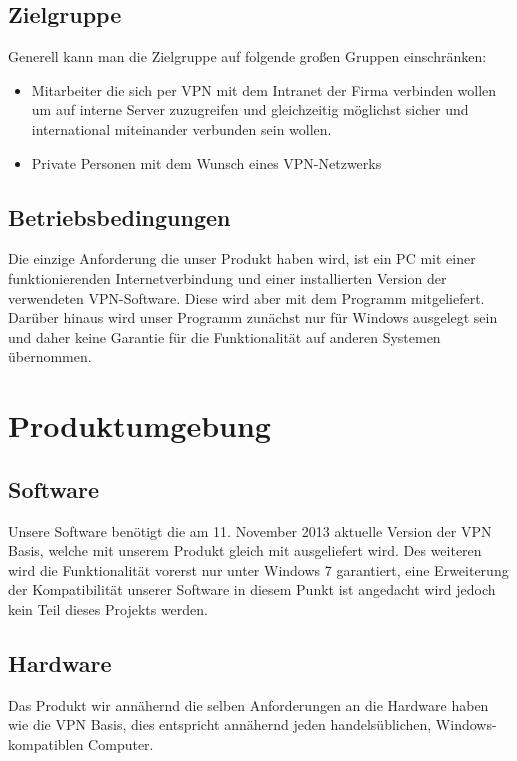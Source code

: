 \documentclass[a4paper,12pt]{scrreprt}
\begin{document}
	 	
		
		
		
	\section{Zielgruppe}
	
	Generell kann man die Zielgruppe auf folgende großen Gruppen einschränken:
	\begin{itemize}
	\item Mitarbeiter die sich per VPN mit dem Intranet der Firma verbinden wollen um auf interne Server zuzugreifen und gleichzeitig möglichst sicher und international miteinander verbunden sein wollen.
	\item Private Personen mit dem Wunsch eines VPN-Netzwerks
	\end{itemize}
		
	\section{Betriebsbedingungen}
	Die einzige Anforderung die unser Produkt haben wird, ist ein PC mit einer funktionierenden Internetverbindung und einer installierten Version der verwendeten VPN-Software. Diese wird aber mit dem Programm mitgeliefert. Darüber hinaus wird unser Programm zunächst nur für Windows ausgelegt sein und daher keine Garantie für die Funktionalität auf anderen Systemen übernommen.
		
\chapter{Produktumgebung}
	
	\section{Software}
		
		Unsere Software benötigt die am 11. November 2013 aktuelle Version der VPN Basis, welche mit unserem Produkt gleich mit ausgeliefert wird. Des weiteren wird die Funktionalität vorerst nur unter Windows 7 garantiert, eine Erweiterung der Kompatibilität unserer Software in diesem Punkt ist angedacht wird jedoch kein Teil dieses Projekts werden.
		
	\section{Hardware}
		
		Das Produkt wir annähernd die selben Anforderungen an die Hardware haben wie die VPN Basis, dies entspricht annähernd jeden handelsüblichen, Windows-kompatiblen Computer.	
		
\end{document}
